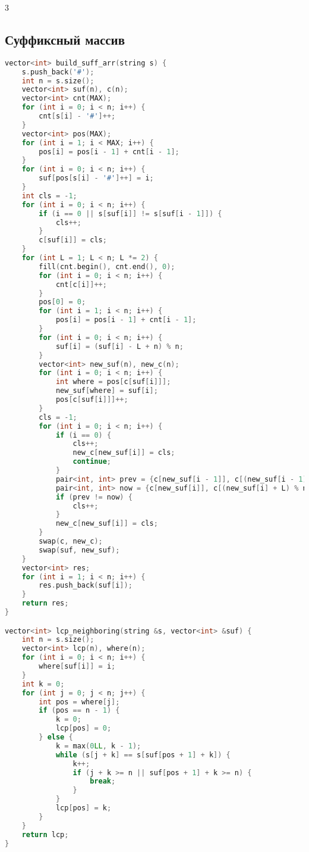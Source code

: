 \documentclass[10pt,a4paper,landscape,twosided]{extarticle}
\begin{document}
\begin{multicols*}{3}
\subsection{Суффиксный массив}
\begin{lstlisting}[language=C++]
vector<int> build_suff_arr(string s) {
    s.push_back('#');
    int n = s.size();
    vector<int> suf(n), c(n);
    vector<int> cnt(MAX);
    for (int i = 0; i < n; i++) {
        cnt[s[i] - '#']++;
    }
    vector<int> pos(MAX);
    for (int i = 1; i < MAX; i++) {
        pos[i] = pos[i - 1] + cnt[i - 1];
    }
    for (int i = 0; i < n; i++) {
        suf[pos[s[i] - '#']++] = i;
    }
    int cls = -1;
    for (int i = 0; i < n; i++) {
        if (i == 0 || s[suf[i]] != s[suf[i - 1]]) {
            cls++;
        }
        c[suf[i]] = cls;
    }
    for (int L = 1; L < n; L *= 2) {
        fill(cnt.begin(), cnt.end(), 0);
        for (int i = 0; i < n; i++) {
            cnt[c[i]]++;
        }
        pos[0] = 0;
        for (int i = 1; i < n; i++) {
            pos[i] = pos[i - 1] + cnt[i - 1];
        }
        for (int i = 0; i < n; i++) {
            suf[i] = (suf[i] - L + n) % n;
        }
        vector<int> new_suf(n), new_c(n);
        for (int i = 0; i < n; i++) {
            int where = pos[c[suf[i]]];
            new_suf[where] = suf[i];
            pos[c[suf[i]]]++;
        }
        cls = -1;
        for (int i = 0; i < n; i++) {
            if (i == 0) {
                cls++;
                new_c[new_suf[i]] = cls;
                continue;
            }
            pair<int, int> prev = {c[new_suf[i - 1]], c[(new_suf[i - 1] + L) % n]};
            pair<int, int> now = {c[new_suf[i]], c[(new_suf[i] + L) % n]};
            if (prev != now) {
                cls++;
            }
            new_c[new_suf[i]] = cls;
        }
        swap(c, new_c);
        swap(suf, new_suf);
    }
    vector<int> res;
    for (int i = 1; i < n; i++) {
        res.push_back(suf[i]);
    }
    return res;
}

vector<int> lcp_neighboring(string &s, vector<int> &suf) {
    int n = s.size();
    vector<int> lcp(n), where(n);
    for (int i = 0; i < n; i++) {
        where[suf[i]] = i;
    }
    int k = 0;
    for (int j = 0; j < n; j++) {
        int pos = where[j];
        if (pos == n - 1) {
            k = 0;
            lcp[pos] = 0;
        } else {
            k = max(0LL, k - 1);
            while (s[j + k] == s[suf[pos + 1] + k]) {
                k++;
                if (j + k >= n || suf[pos + 1] + k >= n) {
                    break;
                }
            }
            lcp[pos] = k;
        }
    }
    return lcp;
}


\end{lstlisting}
\end{multicols*}
\end{document}
